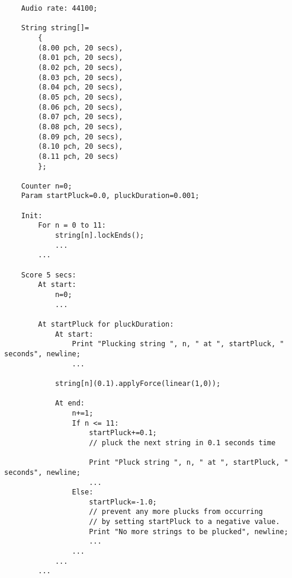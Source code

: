 \begin{verbatim}
    Audio rate: 44100;
        
    String string[]=
        {
        (8.00 pch, 20 secs),
        (8.01 pch, 20 secs),
        (8.02 pch, 20 secs),
        (8.03 pch, 20 secs),    
        (8.04 pch, 20 secs),
        (8.05 pch, 20 secs),
        (8.06 pch, 20 secs),
        (8.07 pch, 20 secs),    
        (8.08 pch, 20 secs),
        (8.09 pch, 20 secs),
        (8.10 pch, 20 secs),
        (8.11 pch, 20 secs)
        };
        
    Counter n=0;
    Param startPluck=0.0, pluckDuration=0.001;
        
    Init:
        For n = 0 to 11:
            string[n].lockEnds();
            ...
        ...
        
    Score 5 secs:
        At start:
            n=0;
            ...
        
        At startPluck for pluckDuration:
            At start:
                Print "Plucking string ", n, " at ", startPluck, " seconds", newline;
                ...
        
            string[n](0.1).applyForce(linear(1,0));
        
            At end:
                n+=1;
                If n <= 11:
                    startPluck+=0.1;
                    // pluck the next string in 0.1 seconds time
    
                    Print "Pluck string ", n, " at ", startPluck, " seconds", newline;
                    ...
                Else:
                    startPluck=-1.0;
                    // prevent any more plucks from occurring
                    // by setting startPluck to a negative value.
                    Print "No more strings to be plucked", newline;
                    ...
                ...
            ...
        ...
\end{verbatim}










